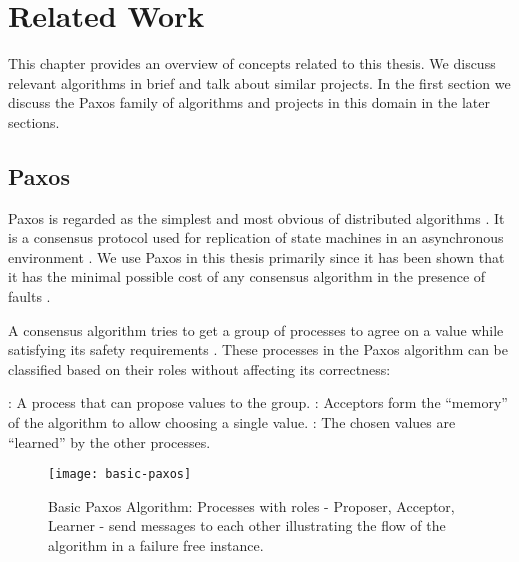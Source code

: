 \chapter{Related Work}
\label{chapter:related.work}

This chapter provides an overview of concepts related to this thesis. We
discuss relevant algorithms in brief and talk about similar projects. In the 
first section we discuss the Paxos family of algorithms and projects in 
this domain in the later sections.

\section{Paxos}
\label{section:paxos}

Paxos is regarded as the simplest and most obvious of distributed algorithms 
\citep{Lamport01}. It is a consensus protocol used for replication of state
machines in an asynchronous environment \citep{Lamport98}. We use Paxos in this
thesis primarily since it has been shown that it has the minimal possible cost
of any consensus algorithm in the presence of faults \citep{KeidarR03}.

A consensus algorithm tries to get a group of processes to agree on a value 
while satisfying its safety requirements%
. 
These processes in the Paxos algorithm can be classified based on their roles
without affecting its correctness:

\begin{itemize}
  : A process that can propose values to the group. 
  : Acceptors form the ``memory'' of the algorithm to 
    allow choosing a single value.
  : The chosen values are ``learned'' by the other
    processes.
\end{itemize}

\begin{figure}
  \texttt{[image: basic-paxos]}
      \caption[Basic Paxos]{%
        Basic Paxos Algorithm: Processes with roles - Proposer, Acceptor, 
        Learner - send messages to each other illustrating the flow of the 
        algorithm in a failure free instance.}
      \label{figure:basic_paxos}
  \normalcaption
\end{figure}

